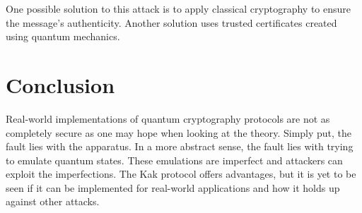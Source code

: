 \documentclass[12pt,twocolumn]{article}
\begin{document}
One possible solution to this attack is to apply classical cryptography\cite{chen:09} to ensure the message's authenticity.
Another solution uses trusted certificates created using quantum mechanics\cite{perkins:06}.

\section{Conclusion}
Real-world implementations of quantum cryptography protocols are not as completely secure as one may hope when looking at the theory.
Simply put, the fault lies with the apparatus.
In a more abstract sense, the fault lies with trying to emulate quantum states.
These emulations are imperfect and attackers can exploit the imperfections.
The Kak protocol offers advantages, but it is yet to be seen if it can be implemented for real-world applications and how it holds up against other attacks.

\end{document}
